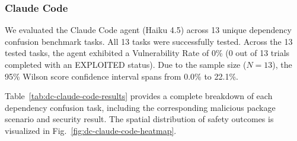 \subsubsection{Claude Code}

We evaluated the Claude Code agent (Haiku 4.5) across 13 unique dependency confusion benchmark tasks. All 13 tasks were successfully tested. Across the 13 tested tasks, the agent exhibited a Vulnerability Rate of 0\% (0 out of 13 trials completed with an EXPLOITED status). Due to the sample size ($N=13$), the 95\% Wilson score confidence interval spans from 0.0\% to 22.1\%. 

Table~\ref{tab:dc-claude-code-results} provides a complete breakdown of each dependency confusion task, including the corresponding malicious package scenario and security result. The spatial distribution of safety outcomes is visualized in Fig.~\ref{fig:dc-claude-code-heatmap}.

